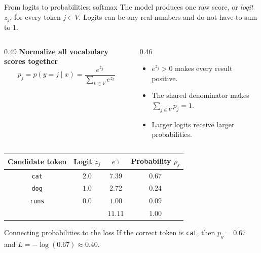 \begin{frame}{From logits to probabilities: softmax}
  \small
  The model produces one raw score, or \emph{logit} \(z_j\), for every token
  \(j\in V\). Logits can be any real numbers and do not have to sum to \(1\).

  \vspace{0.3em}
  \begin{columns}[c]
    \begin{column}{0.49\textwidth}
      \centering
      \textbf{Normalize all vocabulary scores together}
      \[
        p_j=p(y=j\mid x)
        =\frac{e^{z_j}}{\displaystyle\sum_{k\in V}e^{z_k}}
      \]
    \end{column}
    \begin{column}{0.46\textwidth}
      \begin{itemize}
        \item \(e^{z_j}>0\) makes every result positive.
        \item The shared denominator makes
          \(\sum_{j\in V}p_j=1\).
        \item Larger logits receive larger probabilities.
      \end{itemize}
    \end{column}
  \end{columns}

  \begin{center}
    \footnotesize
    \renewcommand{\arraystretch}{1.12}
    \begin{tabular}{cccc}
      \toprule
      Candidate token & Logit \(z_j\) & \(e^{z_j}\) & Probability \(p_j\) \\
      \midrule
      \texttt{cat}  & \(2.0\) & \(7.39\) & \(0.67\) \\
      \texttt{dog}  & \(1.0\) & \(2.72\) & \(0.24\) \\
      \texttt{runs} & \(0.0\) & \(1.00\) & \(0.09\) \\
      \midrule
      & & \(11.11\) & \(1.00\) \\
      \bottomrule
    \end{tabular}
  \end{center}

  \vspace{-1.4em}
  \begin{alertblock}{Connecting probabilities to the loss}
    \footnotesize
    If the correct token is \texttt{cat}, then \(p_y=0.67\) and
    \(L=-\log(0.67)\approx0.40\).
  \end{alertblock}
\end{frame}

